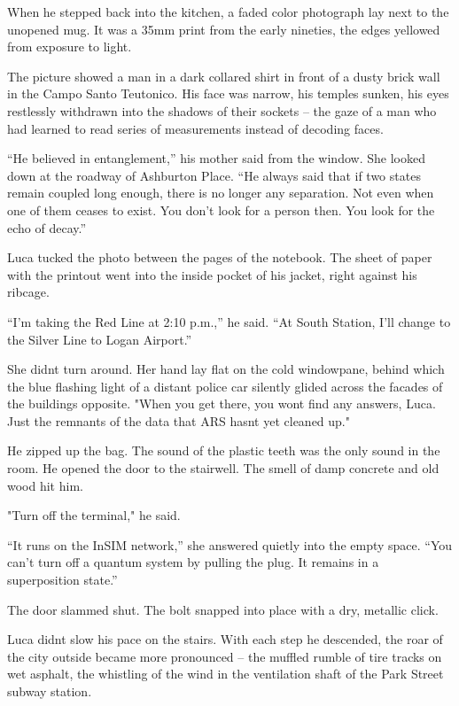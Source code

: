\documentclass[
  ngerman,
]{article}
\begin{document}
When he stepped back into the kitchen, a faded color photograph lay next
to the unopened mug. It was a 35mm print from the early nineties, the
edges yellowed from exposure to light.

The picture showed a man in a dark collared shirt in front of a dusty
brick wall in the Campo Santo Teutonico. His face was narrow, his
temples sunken, his eyes restlessly withdrawn into the shadows of their
sockets -- the gaze of a man who had learned to read series of
measurements instead of decoding faces.

``He believed in entanglement,'' his mother said from the window. She
looked down at the roadway of Ashburton Place. ``He always said that if
two states remain coupled long enough, there is no longer any
separation. Not even when one of them ceases to exist. You don't look
for a person then. You look for the echo of decay.''

Luca tucked the photo between the pages of the notebook. The sheet of
paper with the printout went into the inside pocket of his jacket, right
against his ribcage.

``I'm taking the Red Line at 2:10 p.m.,'' he said. ``At South Station,
I'll change to the Silver Line to Logan Airport.''

She didn\textquotesingle t turn around. Her hand lay flat on the cold
windowpane, behind which the blue flashing light of a distant police car
silently glided across the facades of the buildings opposite. "When you
get there, you won\textquotesingle t find any answers, Luca. Just the
remnants of the data that ARS hasn\textquotesingle t yet cleaned up."

He zipped up the bag. The sound of the plastic teeth was the only sound
in the room. He opened the door to the stairwell. The smell of damp
concrete and old wood hit him.

"Turn off the terminal," he said.

``It runs on the InSIM network,'' she answered quietly into the empty
space. ``You can't turn off a quantum system by pulling the plug. It
remains in a superposition state.''

The door slammed shut. The bolt snapped into place with a dry, metallic
click.

Luca didn\textquotesingle t slow his pace on the stairs. With each step
he descended, the roar of the city outside became more pronounced -- the
muffled rumble of tire tracks on wet asphalt, the whistling of the wind
in the ventilation shaft of the Park Street subway station.
\end{document}
